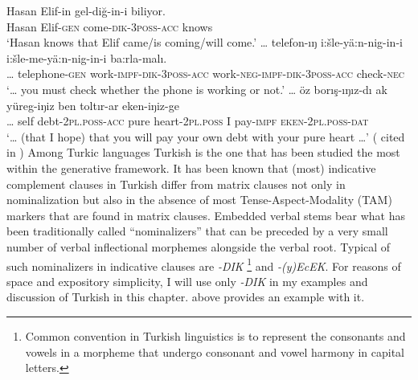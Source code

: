 \documentclass[output=paper]{langsci/langscibook}
\begin{document}
\ea%
\settowidth{}
    \label{kelepirex:key:1}
    \gll Hasan Elif-in gel-diğ-in-i biliyor.\\
    Hasan Elif-\textsc{gen} come-\textsc{dik}{}-\textsc{3poss}{}-\textsc{acc} knows\\
    \glt `Hasan knows that Elif came/is coming/will come.'
\ex%
    \label{kelepirex:key:2}
    \gll \ldots{} telefon-ıŋ i:šle-yä:n-nig-in-i i:šle-me-yä:n-nig-in-i ba:rla-malı.\\
    \ldots{} telephone-\textsc{gen}  work-\textsc{impf}{}-\textsc{dik}{}-\textsc{3poss}{}-\textsc{acc} work-\textsc{neg}{}-\textsc{impf}{}-\textsc{dik}{}-\textsc{3poss}{}-\textsc{acc} check-\textsc{nec} \\
    \glt `\ldots{} you must check whether the phone is working or not.'
\ex%
    \label{kelepirex:key:3}
    \gll \ldots{} öz borış-ıŋız-dı ak yüreg-iŋiz ben toltır-ar eken-iŋiz-ge \\
    \ldots{} self debt-\textsc{2pl.poss}{}-\textsc{acc} pure heart-\textsc{2pl.poss} I pay-\textsc{impf} \textsc{eken}{}-\textsc{2pl.poss}{}-\textsc{dat} \\
    \glt `\ldots{} (that I hope) that you will pay your own debt with your pure heart \ldots{}'
            (\citealp[125]{DjanbidaevaOgurlieva1995} cited in \citealp[354]{Karakoc2007})
\z 
Among Turkic languages Turkish is the one that has been studied the most within the generative framework. 
It has been known that (most) indicative complement clauses in Turkish differ from matrix clauses not only in nominalization 
but also in the absence of most Tense-Aspect-Modality (TAM) markers that are found in matrix clauses.  
Embedded verbal stems bear what has been traditionally called ``nominalizers'' that can be preceded by a very small number 
of verbal inflectional morphemes alongside the verbal root. 
Typical of such nominalizers in indicative clauses are \textit{-DIK}%
\footnote{%
    Common convention in Turkish linguistics is to represent the consonants and vowels in a morpheme 
    that undergo consonant and vowel harmony in capital letters.
}
and \textit{-(y)EcEK}. 
For reasons of space and expository simplicity, I will use only \textit{-DIK} in my examples and discussion of Turkish in this chapter. 
 above provides an example with it. 
\end{document}
